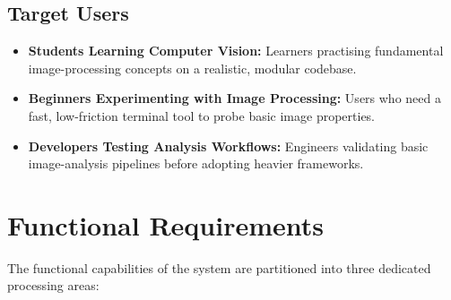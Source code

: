\documentclass[11pt,a4paper]{article}
\begin{document}
\subsection{Target Users}
\begin{itemize}[leftmargin=1.5em]
    \item \textbf{Students Learning Computer Vision:} Learners practising fundamental image-processing concepts on a realistic, modular codebase.
    \item \textbf{Beginners Experimenting with Image Processing:} Users who need a fast, low-friction terminal tool to probe basic image properties.
    \item \textbf{Developers Testing Analysis Workflows:} Engineers validating basic image-analysis pipelines before adopting heavier frameworks.
\end{itemize}

\section{Functional Requirements}
The functional capabilities of the system are partitioned into three dedicated processing areas:
\end{document}
